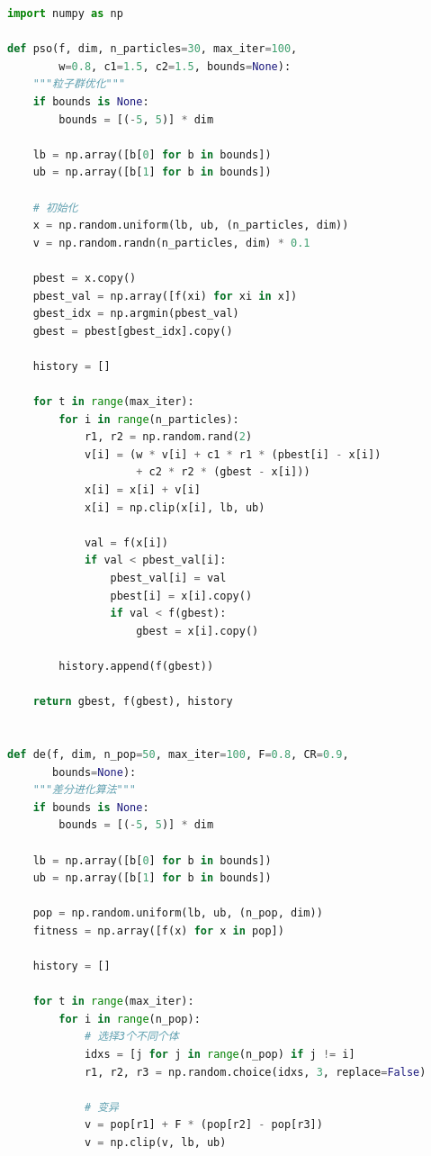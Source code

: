 \begin{lstlisting}[language=Python, caption=PSO与DE实现]
import numpy as np

def pso(f, dim, n_particles=30, max_iter=100, 
        w=0.8, c1=1.5, c2=1.5, bounds=None):
    """粒子群优化"""
    if bounds is None:
        bounds = [(-5, 5)] * dim
    
    lb = np.array([b[0] for b in bounds])
    ub = np.array([b[1] for b in bounds])
    
    # 初始化
    x = np.random.uniform(lb, ub, (n_particles, dim))
    v = np.random.randn(n_particles, dim) * 0.1
    
    pbest = x.copy()
    pbest_val = np.array([f(xi) for xi in x])
    gbest_idx = np.argmin(pbest_val)
    gbest = pbest[gbest_idx].copy()
    
    history = []
    
    for t in range(max_iter):
        for i in range(n_particles):
            r1, r2 = np.random.rand(2)
            v[i] = (w * v[i] + c1 * r1 * (pbest[i] - x[i]) 
                    + c2 * r2 * (gbest - x[i]))
            x[i] = x[i] + v[i]
            x[i] = np.clip(x[i], lb, ub)
            
            val = f(x[i])
            if val < pbest_val[i]:
                pbest_val[i] = val
                pbest[i] = x[i].copy()
                if val < f(gbest):
                    gbest = x[i].copy()
        
        history.append(f(gbest))
    
    return gbest, f(gbest), history


def de(f, dim, n_pop=50, max_iter=100, F=0.8, CR=0.9,
       bounds=None):
    """差分进化算法"""
    if bounds is None:
        bounds = [(-5, 5)] * dim
    
    lb = np.array([b[0] for b in bounds])
    ub = np.array([b[1] for b in bounds])
    
    pop = np.random.uniform(lb, ub, (n_pop, dim))
    fitness = np.array([f(x) for x in pop])
    
    history = []
    
    for t in range(max_iter):
        for i in range(n_pop):
            # 选择3个不同个体
            idxs = [j for j in range(n_pop) if j != i]
            r1, r2, r3 = np.random.choice(idxs, 3, replace=False)
            
            # 变异
            v = pop[r1] + F * (pop[r2] - pop[r3])
            v = np.clip(v, lb, ub)
            

\end{lstlisting}
